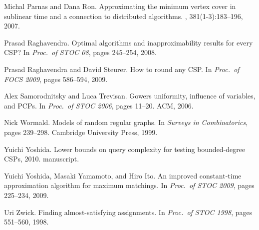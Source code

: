 \documentclass[letterpaper, 11pt]{article}
\begin{document}
\begin{thebibliography}{10}
Michal Parnas and Dana Ron.
\newblock Approximating the minimum vertex cover in sublinear time and a
  connection to distributed algorithms.
, 381(1-3):183--196, 2007.

Prasad Raghavendra.
\newblock Optimal algorithms and inapproximability results for every {CSP}?
\newblock In {\em Proc.~of STOC 08}, pages 245--254, 2008.

Prasad Raghavendra and David Steurer.
\newblock How to round any {CSP}.
\newblock In {\em Proc.~of FOCS 2009}, pages 586--594, 2009.

Alex Samorodnitsky and Luca Trevisan.
\newblock Gowers uniformity, influence of variables, and {PCPs}.
\newblock In {\em Proc.~of STOC 2006}, pages 11--20. ACM, 2006.

Nick Wormald.
\newblock Models of random regular graphs.
\newblock In {\em Surveys in Combinatorics}, pages 239--298. Cambridge
  University Press, 1999.

Yuichi Yoshida.
\newblock Lower bounds on query complexity for testing bounded-degree {CSPs},
  2010.
\newblock manuscript.

Yuichi Yoshida, Masaki Yamamoto, and Hiro Ito.
\newblock An improved constant-time approximation algorithm for maximum
  matchings.
\newblock In {\em Proc.~of STOC 2009}, pages 225--234, 2009.

Uri Zwick.
\newblock Finding almost-satisfying assignments.
\newblock In {\em Proc.~of STOC 1998}, pages 551--560, 1998.

\end{thebibliography}

\newpage

\appendix
\noindent {\bf\Large \appendixname}
\end{document}
